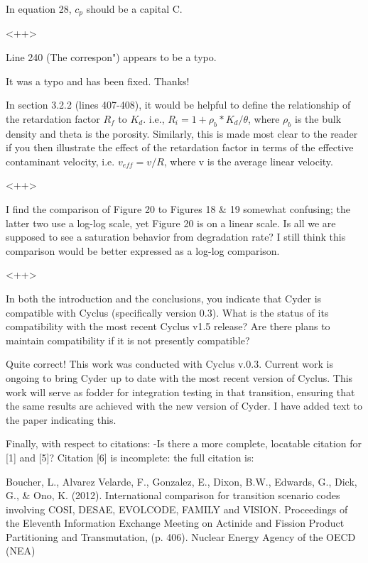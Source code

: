 \documentclass[answers,12pt]{exam}
\begin{document}
\begin{questions}
\question In equation 28, $c_p$ should be a capital C.
\begin{solution}
<++>
\end{solution}

\question Line 240 (The correspon") appears to be a typo.
\begin{solution}
It was a typo and has been fixed. Thanks!
\end{solution}

\question In section 3.2.2 (lines 407-408), it would be helpful to define the relationship of the retardation factor $R_f$ to $K_d$. i.e., $R_i = 1 + \rho_b 
* K_d / \theta$, where $\rho_b$ is the bulk density and theta is the porosity.  Similarly, this is made most clear to the reader if you then illustrate the effect of the retardation factor in terms of the effective contaminant velocity, i.e. $v_{eff} = v/R$, where v is the average linear velocity.
\begin{solution}
<++>
\end{solution}

\question I find the comparison of Figure 20 to Figures 18 \& 19 somewhat confusing; the latter two use a log-log scale, yet Figure 20 is on a linear scale. Is all we are supposed to see a saturation behavior from degradation rate? I still think this comparison would be better expressed as a log-log comparison.
\begin{solution}
<++>
\end{solution}

\question In both the introduction and the conclusions, you indicate that Cyder is compatible with Cyclus (specifically version 0.3). What is the status of its compatibility with the most recent Cyclus v1.5 release? Are there plans to maintain compatibility if it is not presently compatible?
\begin{solution}
Quite correct! This work was conducted with Cyclus v.0.3. Current work is ongoing to 
bring Cyder up to date with the most recent version of Cyclus. This work will 
serve as fodder for integration testing in that transition, ensuring that the 
same results are achieved with the new version of Cyder. I have added text to 
the paper indicating this.
\end{solution}

\question Finally, with respect to citations: 
-Is there a more complete, locatable citation for [1] and [5]? Citation [6] is incomplete: the full citation is:

Boucher, L., Alvarez Velarde, F., Gonzalez, E., Dixon, B.W., Edwards, G., Dick, 
G., \& Ono, K. (2012). International comparison for transition scenario codes involving COSI, DESAE, EVOLCODE, FAMILY and VISION. Proceedings of the Eleventh Information Exchange Meeting on Actinide and Fission Product Partitioning and Transmutation, (p. 406). Nuclear Energy Agency of the OECD (NEA)


\end{questions}
\end{document}
